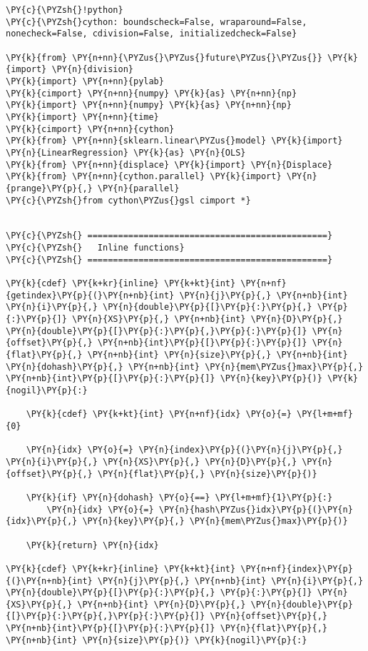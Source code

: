 \begin{Verbatim}[commandchars=\\\{\}]
\PY{c}{\PYZsh{}!python}
\PY{c}{\PYZsh{}cython: boundscheck=False, wraparound=False, nonecheck=False, cdivision=False, initializedcheck=False}

\PY{k}{from} \PY{n+nn}{\PYZus{}\PYZus{}future\PYZus{}\PYZus{}} \PY{k}{import} \PY{n}{division}
\PY{k}{import} \PY{n+nn}{pylab}
\PY{k}{cimport} \PY{n+nn}{numpy} \PY{k}{as} \PY{n+nn}{np}
\PY{k}{import} \PY{n+nn}{numpy} \PY{k}{as} \PY{n+nn}{np}
\PY{k}{import} \PY{n+nn}{time}
\PY{k}{cimport} \PY{n+nn}{cython}
\PY{k}{from} \PY{n+nn}{sklearn.linear\PYZus{}model} \PY{k}{import} \PY{n}{LinearRegression} \PY{k}{as} \PY{n}{OLS}
\PY{k}{from} \PY{n+nn}{displace} \PY{k}{import} \PY{n}{Displace}
\PY{k}{from} \PY{n+nn}{cython.parallel} \PY{k}{import} \PY{n}{prange}\PY{p}{,} \PY{n}{parallel}
\PY{c}{\PYZsh{}from cython\PYZus{}gsl cimport *}


\PY{c}{\PYZsh{} ===============================================}
\PY{c}{\PYZsh{}   Inline functions}
\PY{c}{\PYZsh{} ===============================================}

\PY{k}{cdef} \PY{k+kr}{inline} \PY{k+kt}{int} \PY{n+nf}{getindex}\PY{p}{(}\PY{n+nb}{int} \PY{n}{j}\PY{p}{,} \PY{n+nb}{int} \PY{n}{i}\PY{p}{,} \PY{n}{double}\PY{p}{[}\PY{p}{:}\PY{p}{,} \PY{p}{:}\PY{p}{]} \PY{n}{XS}\PY{p}{,} \PY{n+nb}{int} \PY{n}{D}\PY{p}{,} \PY{n}{double}\PY{p}{[}\PY{p}{:}\PY{p}{,}\PY{p}{:}\PY{p}{]} \PY{n}{offset}\PY{p}{,} \PY{n+nb}{int}\PY{p}{[}\PY{p}{:}\PY{p}{]} \PY{n}{flat}\PY{p}{,} \PY{n+nb}{int} \PY{n}{size}\PY{p}{,} \PY{n+nb}{int} \PY{n}{dohash}\PY{p}{,} \PY{n+nb}{int} \PY{n}{mem\PYZus{}max}\PY{p}{,} \PY{n+nb}{int}\PY{p}{[}\PY{p}{:}\PY{p}{]} \PY{n}{key}\PY{p}{)} \PY{k}{nogil}\PY{p}{:}
    
    \PY{k}{cdef} \PY{k+kt}{int} \PY{n+nf}{idx} \PY{o}{=} \PY{l+m+mf}{0}
    
    \PY{n}{idx} \PY{o}{=} \PY{n}{index}\PY{p}{(}\PY{n}{j}\PY{p}{,} \PY{n}{i}\PY{p}{,} \PY{n}{XS}\PY{p}{,} \PY{n}{D}\PY{p}{,} \PY{n}{offset}\PY{p}{,} \PY{n}{flat}\PY{p}{,} \PY{n}{size}\PY{p}{)}
    
    \PY{k}{if} \PY{n}{dohash} \PY{o}{==} \PY{l+m+mf}{1}\PY{p}{:}
        \PY{n}{idx} \PY{o}{=} \PY{n}{hash\PYZus{}idx}\PY{p}{(}\PY{n}{idx}\PY{p}{,} \PY{n}{key}\PY{p}{,} \PY{n}{mem\PYZus{}max}\PY{p}{)}

    \PY{k}{return} \PY{n}{idx}

\PY{k}{cdef} \PY{k+kr}{inline} \PY{k+kt}{int} \PY{n+nf}{index}\PY{p}{(}\PY{n+nb}{int} \PY{n}{j}\PY{p}{,} \PY{n+nb}{int} \PY{n}{i}\PY{p}{,} \PY{n}{double}\PY{p}{[}\PY{p}{:}\PY{p}{,} \PY{p}{:}\PY{p}{]} \PY{n}{XS}\PY{p}{,} \PY{n+nb}{int} \PY{n}{D}\PY{p}{,} \PY{n}{double}\PY{p}{[}\PY{p}{:}\PY{p}{,}\PY{p}{:}\PY{p}{]} \PY{n}{offset}\PY{p}{,} \PY{n+nb}{int}\PY{p}{[}\PY{p}{:}\PY{p}{]} \PY{n}{flat}\PY{p}{,} \PY{n+nb}{int} \PY{n}{size}\PY{p}{)} \PY{k}{nogil}\PY{p}{:}


\end{Verbatim}
